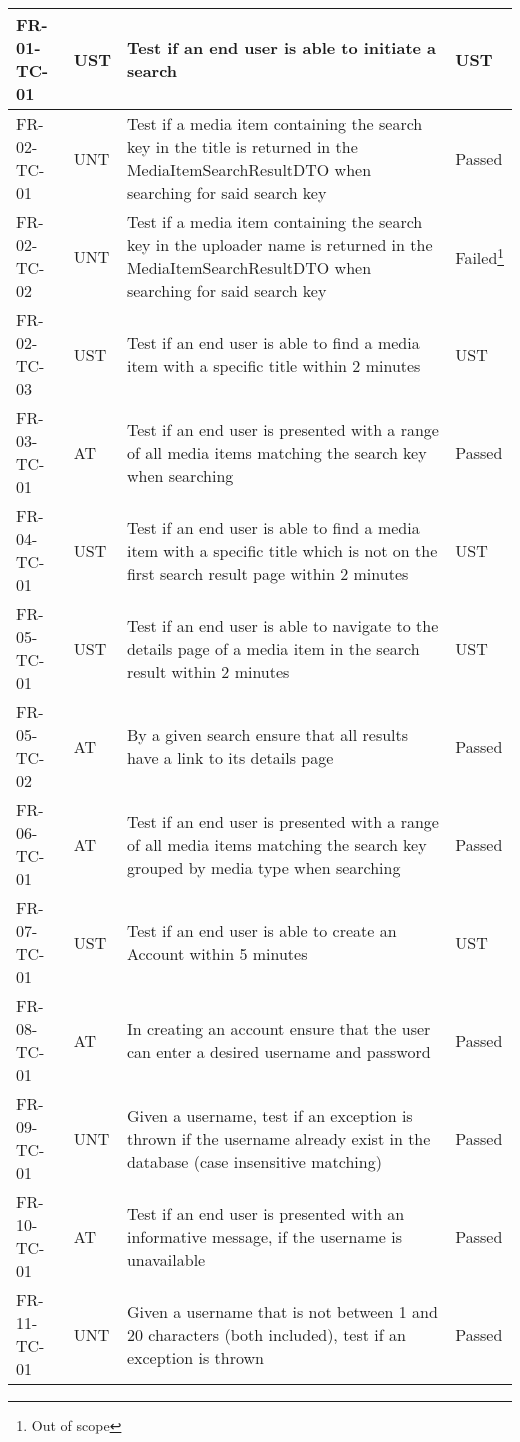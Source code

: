 \documentclass[../report.tex]{subfiles}
\begin{document}
\begin{longtable}{|L{2.1cm}|L{1cm}|L{12.4cm}|L{1.4cm}|}
FR-01-TC-01 & UST & Test if an end user is able to initiate a search & UST  \\ \hline
FR-02-TC-01& UNT& Test if a media item containing the search key in the title is returned in the MediaItemSearchResultDTO when searching for said search key& Passed  \\ \hline
FR-02-TC-02& UNT& Test if a media item containing the search key in the uploader name is returned in the MediaItemSearchResultDTO when searching for said search key& Failed\footnote{Out of scope}  \\ \hline
FR-02-TC-03&UST&Test if an end user is able to find a media item with a specific title within 2 minutes&UST  \\ \hline
FR-03-TC-01&AT&Test if an end user is presented with a range of all media items matching the search key when searching &Passed  \\ \hline
FR-04-TC-01&UST&Test if an end user is able to find a media item with a specific title which is not on the first search result page within 2 minutes&UST  \\ \hline
FR-05-TC-01&UST&Test if an end user is able to navigate to the details page of a media item in the search result within 2 minutes&UST  \\ \hline
FR-05-TC-02&AT&By a given search ensure that all results have a link to its details page&Passed  \\ \hline
FR-06-TC-01&AT&Test if an end user is presented with a range of all media items matching the search key grouped by media type when searching &Passed  \\ \hline
FR-07-TC-01&UST&Test if an end user is able to create an Account within 5 minutes&UST  \\ \hline
FR-08-TC-01&AT&In creating an account ensure that the user can enter a desired username and password&Passed  \\ \hline
FR-09-TC-01&UNT&Given a username, test if an exception is thrown if the username already exist in the database (case insensitive matching)&Passed  \\ \hline
FR-10-TC-01&AT&Test if an end user is presented with an informative message, if the username is unavailable&Passed  \\ \hline
FR-11-TC-01&UNT&Given a username that is not between 1 and 20 characters (both included), test if an exception is thrown&Passed  \\ \hline

\end{longtable}
\end{document}

